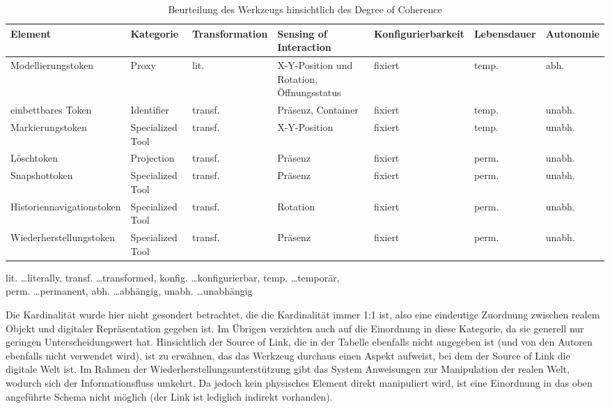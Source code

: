 \begin{table}[htbp]
	\centering
	\caption{Beurteilung des Werkzeugs hinsichtlich des Degree of Coherence}
	\begin{tabular}{| p{2cm} || p{2cm} | p{} | p{} | p{} | p{} | p{} |} \hline
		Element & Kategorie & Trans\-for\-mation & Sensing of Inter\-action & Konfig\-urierbar\-keit & Lebens\-dauer & Auto\-nomie \\ \hline \hline
		Modell\-ierungs\-token  & Proxy & lit. & X-Y-Position und Rotation, Öffnungsstatus & fixiert & temp. & abh. \\ \hline
		einbett\-bares Token & Identifier & transf. & Präsenz, Container & fixiert & temp. & unabh. \\ \hline
		Mark\-ierungs\-token & Specialized Tool & transf. & X-Y-Position & fixiert & temp. & unabh. \\ \hline
		Löschtoken & Projection & transf. & Präsenz & fixiert & perm. & unabh. \\ \hline
		Snapshot\-token & Specialized Tool & transf. & Präsenz & fixiert & perm. & unabh. \\ \hline
		Historien\-navigations\-token & Specialized Tool & transf. & Rotation & fixiert & perm. & unabh. \\ \hline
		Wieder\-herstellungs\-token & Specialized Tool & transf. & Präsenz & fixiert & perm. & unabh. \\ \hline
	\end{tabular}
	\footnotesize lit. \ldots literally, transf. \ldots transformed, konfig. \ldots konfigurierbar, temp. \ldots temporär,\\ perm. \ldots permanent, abh. \ldots abhängig, unabh. \ldots unabhängig
	\label{tab:degree_of_coherence}
\end{table}

Die Kardinalität wurde hier nicht gesondert betrachtet, die die Kardinalität immer 1:1 ist, also eine eindeutige Zuordnung zwischen realem Objekt und digitaler Repräsentation gegeben ist. Im Übrigen verzichten auch \citet{Koleva03} auf die Einordnung in diese Kategorie, da sie generell nur geringen Unterscheidungswert hat. Hinsichtlich der Source of Link, die in der Tabelle ebenfalls nicht angegeben ist (und von den Autoren ebenfalls nicht verwendet wird), ist zu erwähnen, das das Werkzeug durchaus einen Aspekt aufweist, bei dem der Source of Link die digitale Welt ist. Im Rahmen der Wiederherstellungsunterstützung gibt das System Anweisungen zur Manipulation der realen Welt, wodurch sich der Informationsfluss umkehrt. Da jedoch kein physisches Element direkt manipuliert wird, ist eine Einordnung in das oben angeführte Schema nicht möglich (der Link ist lediglich indirekt vorhanden).

